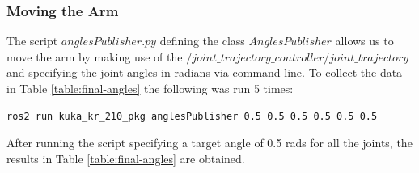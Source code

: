 \documentclass[12pt,oneside]{article}
\begin{document}
\subsubsection{Moving the Arm} \label{experiment:moving-the-arm}
The script $anglesPublisher.py$ defining the class $AnglesPublisher$ allows us to move the arm by making use of the $/joint\_trajectory\_controller/joint\_trajectory$ and specifying the joint angles in radians via command line. To collect the data in Table \ref{table:final-angles} the following was run 5 times:
\begin{tcolorbox}[]
\begin{verbatim}
ros2 run kuka_kr_210_pkg anglesPublisher 0.5 0.5 0.5 0.5 0.5 0.5
\end{verbatim}
\end{tcolorbox}
After running the script specifying a target angle of 0.5 rads for all the joints, the results in Table \ref{table:final-angles} are obtained.
\end{document}
